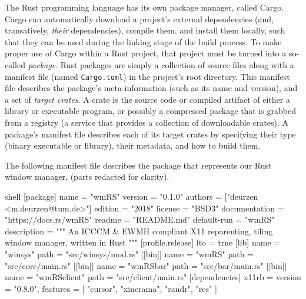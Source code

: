 
The   Rust  programming   language   has  its   own   package  manager,   called
\textup{Cargo}. \textup{Cargo}  can automatically download a  project's external
dependencies (and, transatively, \textit{their} dependencies), compile them, and
install them locally, such that they can be used during the linking stage of the
build process\cite{thecargobook}. To make proper  use of \textup{Cargo} within a
Rust project,  that project  must be turned  into a  so-called \textit{package}.
Rust packages are simply a collection of source files along with a manifest file
(named \texttt{Cargo.toml}) in the project's  root directory. This manifest file
describes the package's  meta-information (such as its name and  version), and a
set of \textit{target crates}\cite{thecargobook}. A  crate is the source code or
compiled  artifact of  either a  library or  executable program,  or possibly  a
compressed package  that is grabbed from  a registry (a service  that provides a
collection of downloadable crates)\cite{thecargobook}. A package's manifest file
describes each of its target crates  by specifying their type (binary executable
or library), their metadata, and how to build them\cite{thecargobook}.

The  following manifest  file describes  the  package that  represents our  Rust
window manager, \wmrs (parts redacted for clarity).

\begin{mintedblock}{shell}
  [package]
  name = "wmRS"
  version = "0.1.0"
  authors = ["deurzen <m.deurzen@tum.de>"]
  edition = "2018"
  license = "BSD3"
  documentation = "https://docs.rs/wmRS"
  readme = "README.md"
  default-run = "wmRS"
  description = """
  An ICCCM & EWMH compliant X11 reparenting,
  tiling window manager, written in Rust
  """
  [profile.release]
  lto = true
  [lib]
  name = "winsys"
  path = "src/winsys/mod.rs"
  [[bin]]
  name = "wmRS"
  path = "src/core/main.rs"
  [[bin]]
  name = "wmRSbar"
  path = "src/bar/main.rs"
  [[bin]]
  name = "wmRSclient"
  path = "src/client/main.rs"
  [dependencies]
  x11rb = {
    version = "0.8.0",
    features = [
      "cursor",
      "xinerama",
      "randr",
      "res"
    ]
  }
\end{mintedblock}


